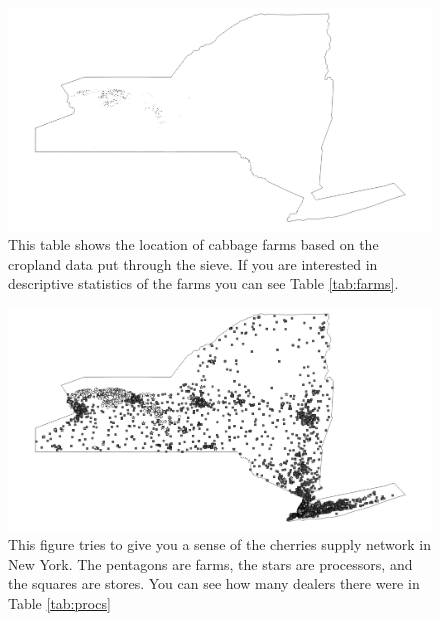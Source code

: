 \documentclass{report}
\begin{document}
\begin{figure}
\centering
\begin{framed}
\includegraphics[scale=.39]{farms_243}
\caption{This table shows the location of cabbage farms based on the cropland data put through the sieve. If you are interested in descriptive statistics of the farms you can see Table \ref{tab:farms}.}
\label{fig:farms_243}
\end{framed}
\end{figure}

\begin{figure}
\centering
\begin{framed}
\includegraphics[scale=.39]{network_243}
\caption{This figure tries to give you a sense of the cherries supply network in New York. The pentagons are farms, the stars are processors, and the squares are stores. You can see how many dealers there were in Table \ref{tab:procs}}
\label{fig:network_243}
\end{framed}
\end{figure}
\end{document}
